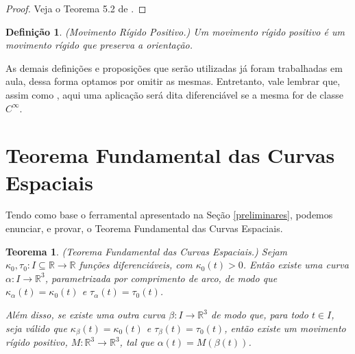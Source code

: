 \documentclass{article}
\newtheorem{theorem}{Teorema}
\newtheorem{definition}{Definição}
\begin{document}
\begin{proof}
    Veja o Teorema 5.2 de \cite{cruz}.
\end{proof}

\begin{definition}(Movimento Rígido Positivo.)
    Um movimento rígido positivo é um movimento rígido que preserva a orientação.
\end{definition}

As demais definições e proposições que serão utilizadas já foram trabalhadas em aula, dessa forma optamos por omitir as mesmas. Entretanto, vale lembrar que, assim como \cite{lima}, aqui uma aplicação será dita diferenciável se a mesma for de classe $C^\infty$.

\section{Teorema Fundamental das Curvas Espaciais}

Tendo como base o ferramental apresentado na Seção \ref{preliminares}, podemos enunciar, e provar, o Teorema Fundamental das Curvas Espaciais.

\begin{theorem}(Teorema Fundamental das Curvas Espaciais.)
    \label{teorema_fundamental}
    Sejam $\kappa_0, \tau_0 : I\subseteq \mathbb{R}\to \mathbb{R}$ funções diferenciáveis, com $\kappa_0(t) > 0$. Então existe uma curva $\alpha : I\to \mathbb{R}^3$, parametrizada por comprimento de arco, de modo que $\kappa_\alpha(t) = \kappa_0(t)$ e $\tau_\alpha(t) = \tau_0(t)$.
    
    Além disso, se existe uma outra curva $\beta : I\to \mathbb{R}^3$ de modo que, para todo $t\in I$, seja válido que $\kappa_\beta(t) = \kappa_0(t)$ e $\tau_\beta(t) = \tau_0(t)$, então existe um movimento rígido positivo, $M : \mathbb{R}^3\to \mathbb{R}^3$, tal que $\alpha(t) = M(\beta(t))$.
\end{theorem}
\end{document}
